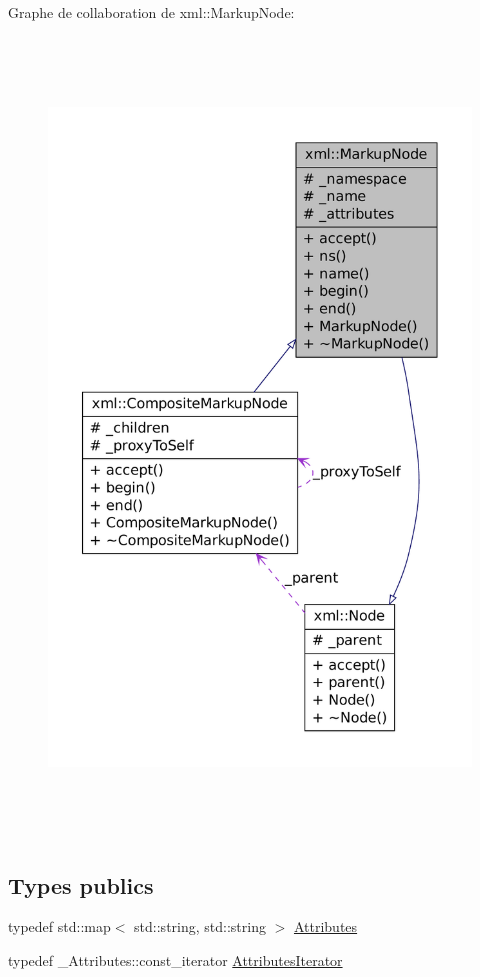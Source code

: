 Graphe de collaboration de xml::MarkupNode:\nopagebreak
\begin{figure}[H]
\begin{center}
\leavevmode
\includegraphics[height=600pt]{classxml_1_1_markup_node__coll__graph}
\end{center}
\end{figure}
\subsection*{Types publics}
\begin{DoxyCompactItemize}
\item 
typedef std::map$<$ std::string, std::string $>$ \hyperlink{classxml_1_1_markup_node_ade6f6045d18042d1a87f80f308f177fb}{Attributes}
\item 
typedef \_\-Attributes::const\_\-iterator \hyperlink{classxml_1_1_markup_node_aab83830a10c767edbed9623af05e7a3c}{AttributesIterator}
\end{DoxyCompactItemize}
